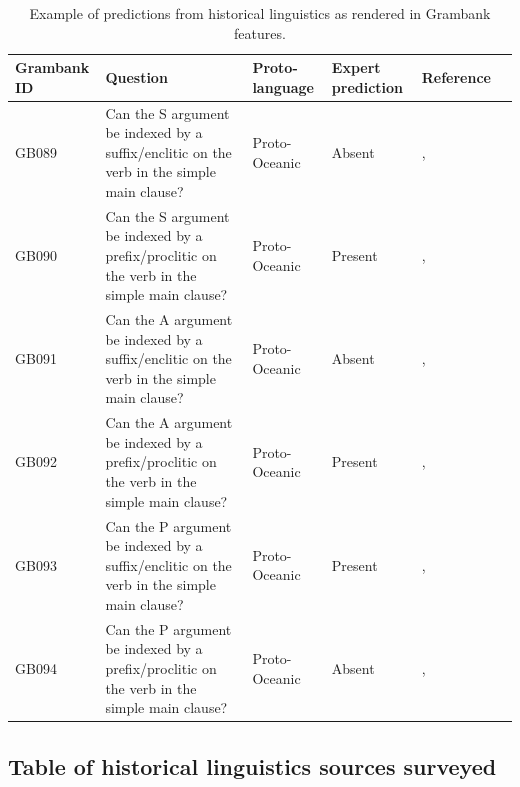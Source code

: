 \documentclass[12pt,letterpaper]{article}
\begin{document}
\begin{table}
\caption{Example of predictions from historical linguistics as rendered in Grambank features.}
\label{example_HL_prediction_table}

\begin{tabular}{|p{3cm}| p{4.5cm}|  p{2.5cm}| p{2.5cm} | p{3cm} |p{2cm}| }
\hline
\textbf{Grambank ID} & \textbf{Question} & \textbf{Proto-language} & \textbf{Expert prediction} & \textbf{Reference} \\ 
\hline
GB089  &Can the S argument be indexed by a suffix/enclitic on the verb in the simple main clause? &Proto-Oceanic &Absent & \citet[498-499]{ross2004morphosyntactic}, \citet[83]{lynchrosscrowley_proto_grammar_oceanic} \\ \hline
GB090 &Can the S argument be indexed by a prefix/proclitic on the verb in the simple main clause? &Proto-Oceanic &Present &\citet[498-499]{ross2004morphosyntactic}, \citet[83]{lynchrosscrowley_proto_grammar_oceanic}  \\ \hline
GB091 &Can the A argument be indexed by a suffix/enclitic on the verb in the simple main clause? &Proto-Oceanic &Absent &\citet[498-499]{ross2004morphosyntactic}, \citet[83]{lynchrosscrowley_proto_grammar_oceanic} \\ \hline
GB092  &Can the A argument be indexed by a prefix/proclitic on the verb in the simple main clause? &Proto-Oceanic &Present &\citet[498-499]{ross2004morphosyntactic}, \citet[83]{lynchrosscrowley_proto_grammar_oceanic}  \\ \hline
GB093  &Can the P argument be indexed by a suffix/enclitic on the verb in the simple main clause? &Proto-Oceanic &Present &\citet[498-499]{ross2004morphosyntactic}, \citet[83]{lynchrosscrowley_proto_grammar_oceanic} \\ \hline
GB094  &Can the P argument be indexed by a prefix/proclitic on the verb in the simple main clause? &Proto-Oceanic &Absent & \citet[498-499]{ross2004morphosyntactic}, \citet[83]{lynchrosscrowley_proto_grammar_oceanic} \\ \hline
\end{tabular}
\end{table}

\FloatBarrier
\newpage
\subsection{Table of historical linguistics sources surveyed}
\label{supp:proto_lg_coding_table}
\end{document}
